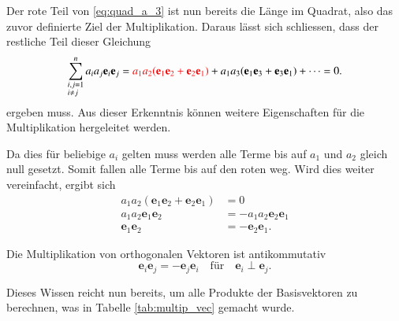 Der rote Teil von \ref{eq:quad_a_3} ist nun bereits die Länge im Quadrat, also das zuvor definierte Ziel der Multiplikation. 
Daraus lässt sich schliessen, dass der restliche Teil dieser Gleichung
\begin{equation}
    \label{eq:Mischterme_Null}
    \sum_{\begin{subarray}{l}i,j=1\\i \neq j\end{subarray}}^n  a_ia_j\textbf{e}_i\textbf{e}_j  = \textcolor{red}{a_1a_2(\textbf{e}_1\textbf{e}_2 + \textbf{e}_2\textbf{e}_1)} + a_1a_3(\textbf{e}_1\textbf{e}_3 + \textbf{e}_3\textbf{e}_1) + \dots =  0.
\end{equation}
 ergeben muss.
 Aus dieser Erkenntnis können weitere Eigenschaften für die Multiplikation hergeleitet werden.
 
Da dies für beliebige $a_i$ gelten muss werden alle Terme bis auf $a_1$ und $a_2$ gleich null gesetzt. Somit fallen alle Terme bis auf den roten weg. Wird dies weiter vereinfacht, ergibt sich
\begin{equation}
\begin{split}
    a_1a_2(\textbf{e}_1\textbf{e}_2 + \textbf{e}_2\textbf{e}_1) &= 0 \\
    a_1a_2\textbf{e}_1\textbf{e}_2 &= -a_1a_2\textbf{e}_2\textbf{e}_1 \\
    \textbf{e}_1\textbf{e}_2 &= -\textbf{e}_2\textbf{e}_1.
\end{split}
\end{equation}
\begin{satz}
  Die Multiplikation von orthogonalen Vektoren ist antikommutativ
    \begin{equation}
        \textbf{e}_i\textbf{e}_j = -\textbf{e}_j\textbf{e}_i \quad \textrm{für} \quad \textbf{e}_i \perp \textbf{e}_j.
    \end{equation}
\end{satz}
Dieses Wissen reicht nun bereits, um alle Produkte der Basisvektoren zu berechnen, was in Tabelle \ref{tab:multip_vec} gemacht wurde.
